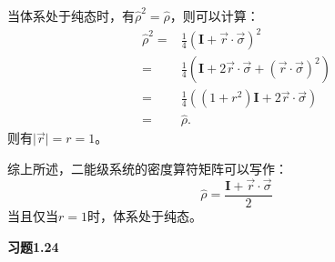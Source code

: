 \documentclass[reqno,a4paper,12pt]{amsart}
\begin{document}
\begin{tcolorbox}[breakable, colback = black!5!white, colframe = black]
当体系处于纯态时，有$\hat{\rho}^2 = \hat{\rho}$，则可以计算：
\begin{align*}
	\hat{\rho}^2 =& \frac{1}{4} (\mathbf{I}+\vec{r}\cdot\vec{\sigma})^2 \\
	=& \frac{1}{4} (\mathbf{I} + 2\vec{r}\cdot\vec{\sigma} + (\vec{r}\cdot\vec{\sigma})^2) \\
	=& \frac{1}{4} ((1+r^2)\mathbf{I} + 2\vec{r}\cdot\vec{\sigma}) \\
	=& \hat{\rho}.
\end{align*}
则有$\vert\vec{r}\vert = r = 1$。

综上所述，二能级系统的密度算符矩阵可以写作：
\[
	\hat{\rho} = \frac{\mathbf{I} + \vec{r} \cdot \vec{\sigma}}{2}
\]
当且仅当$r=1$时，体系处于纯态。
\end{tcolorbox}

\textbf{习题1.24}
\end{document}
